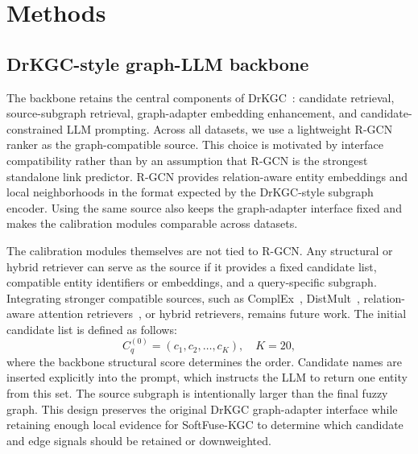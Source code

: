 \documentclass[pdflatex,sn-mathphys-num]{sn-jnl}
\newcommand{\softfuse}{SoftFuse-KGC}
\newcommand{\drkgc}{DrKGC}
\begin{document}

\section{Methods}
\label{sec:methods}

\subsection{\drkgc{}-style graph-LLM backbone}

The backbone retains the central components of \drkgc{}~\citep{xiao2025drkgc}: candidate retrieval, source-subgraph retrieval, graph-adapter embedding enhancement, and candidate-constrained LLM prompting. Across all datasets, we use a lightweight R-GCN~\citep{schlichtkrull2018modeling} ranker as the graph-compatible source. This choice is motivated by interface compatibility rather than by an assumption that R-GCN is the strongest standalone link predictor. R-GCN provides relation-aware entity embeddings and local neighborhoods in the format expected by the \drkgc{}-style subgraph encoder. Using the same source also keeps the graph-adapter interface fixed and makes the calibration modules comparable across datasets.

The calibration modules themselves are not tied to R-GCN. Any structural or hybrid retriever can serve as the source if it provides a fixed candidate list, compatible entity identifiers or embeddings, and a query-specific subgraph. Integrating stronger compatible sources, such as ComplEx~\citep{trouillon2016complex}, DistMult~\citep{yang2014embedding}, relation-aware attention retrievers~\citep{sheikh2021knowledge}, or hybrid retrievers, remains future work. The initial candidate list is defined as follows:
\begin{equation}
C^{(0)}_q=(c_1,c_2,\ldots,c_K), \quad K=20,
\label{eq:candidate_list}
\end{equation}
where the backbone structural score determines the order. Candidate names are inserted explicitly into the prompt, which instructs the LLM to return one entity from this set. The source subgraph is intentionally larger than the final fuzzy graph. This design preserves the original \drkgc{} graph-adapter interface while retaining enough local evidence for \softfuse{} to determine which candidate and edge signals should be retained or downweighted.
\end{document}
